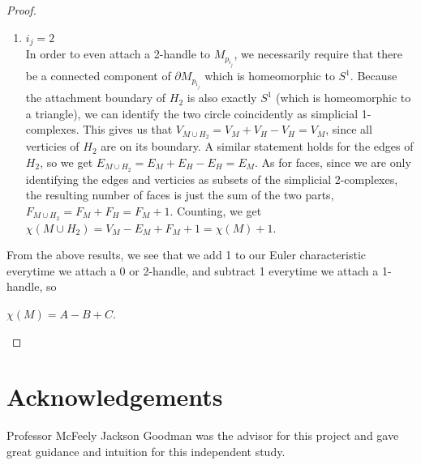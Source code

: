 \documentclass[12pt]{article}
\theoremstyle{definition}
\begin{document}
\begin{proof}
\begin{enumerate}
            \item $i_j = 2$\\
            In order to even attach a 2-handle to $M_{p_{i_j}}$, we necessarily require that there be a connected component of $\partial M_{p_{i_j}}$ which is homeomorphic to $S^1$. Because the attachment boundary of $H_2$ is also exactly $S^1$ (which is homeomorphic to a triangle), we can identify the two circle coincidently as simplicial 1-complexes. This gives us that $V_{M\cup H_2} = V_M + V_H - V_H = V_M$, since all verticies of $H_2$ are on its boundary. A similar statement holds for the edges of $H_2$, so we get $E_{M\cup H_2} = E_M + E_H - E_H = E_M$. As for faces, since we are only identifying the edges and verticies as subsets of the simplicial 2-complexes, the resulting number of faces is just the sum of the two parts, $F_{M\cup H_2} = F_M + F_H = F_M + 1$. Counting, we get $\chi(M\cup H_2) = V_M -E_M + F_M +1 = \chi(M) + 1$. 
      \end{enumerate}

      From the above results, we see that we add 1 to our Euler characteristic everytime we attach a 0 or 2-handle, and subtract 1 everytime we attach a 1-handle, so 
      \begin{center}
            $\chi(M) = A-B+C$. 
      \end{center}
\end{proof}

\section{Acknowledgements}

Professor McFeely Jackson Goodman was the advisor for this project and gave great guidance and intuition for this independent study. 
\end{document}
